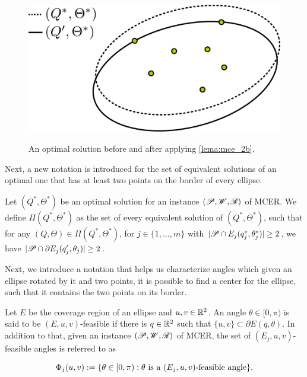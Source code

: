 \begin{figure}
	\centering
	\caption{An optimal solution before and after applying \autoref{lema:mce_2b}.}
	\includegraphics[scale=.38]{tex/figures/ellipse-2-points}
	\fautor
	\label{fig:ellipse-2-points}
\end{figure}

Next, a new notation is introduced for the set of equivalent solutions of an optimal one that has at least two points on the border of every ellipse.

\begin{definicao}
	Let $(Q^*, \Theta^*)$ be an optimal solution for an instance $(\mathscr{P}, \mathscr{W}, \mathscr{R})$ of MCER. We define $\Pi(Q^*, \Theta^*)$ as the set of every equivalent solution of $(Q^*, \Theta^*)$, such that for any $(Q, \Theta)\in\Pi(Q^*, \Theta^*)$, for $j\in\{1, \dots, m\}$ with $|\mathscr{P} \cap E_j(q_j^*, \theta_j^*)|\ge2$, we have $|\mathscr{P} \cap \partial E_j(q_j', \theta_j)| \ge 2$.
\end{definicao}

Next, we introduce a notation that helps us characterize angles which given an ellipse rotated by it and two points, it is possible to find a center for the ellipse, such that it contains the two points on its border.

\begin{definicao}\label{def:feasible_angle}
	Let $E$ be the coverage region of an ellipse and $u, v \in \mathbb{R}^2$. An angle $\theta \in [0, \pi)$ is said to be $(E, u, v)$-feasible if there is $q \in \mathbb{R}^2$ such that $\{u, v\} \subset \partial E(q, \theta)$.
	In addition to that, given an instance  $(\mathscr{P}, \mathscr{W}, \mathscr{R})$ of MCER, the set of $(E_j, u, v)$-feasible angles is referred to as 
	
	\begin{equation}
	\Phi_j(u, v) := \{\theta \in [0, \pi) : \theta \textnormal{ is a } (E_j,u,v)\textnormal{-feasible angle}\}.
	\end{equation}
\end{definicao}

